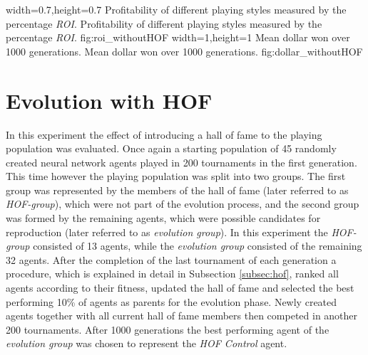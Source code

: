   {width=0.7\textwidth,height=0.7\textheight}%
  {Profitability of different playing styles measured by the percentage \textit{ROI}.}%
  {Profitability of different playing styles measured by the percentage \textit{ROI}.}%
  {fig:roi_withoutHOF}%
  {width=1\textwidth,height=1\textheight}%
  {Mean dollar won over 1000 generations.}%
  {Mean dollar won over 1000 generations.}%
  {fig:dollar_withoutHOF}%
  \pagebreak
\section{Evolution with HOF}
In this experiment the effect of introducing a hall of fame to the playing population was evaluated. Once again a starting population of 45 randomly created neural network agents played in 200 tournaments in the first generation. This time however the playing population was split into two groups. The first group was represented by the members of the hall of fame (later referred to as \textit{HOF-group}), which were not part of the evolution process, and the second group was formed by the remaining agents, which were possible candidates for reproduction (later referred to as \textit{evolution group}). In this experiment the \textit{HOF-group} consisted of 13 agents, while the \textit{evolution group} consisted of the remaining 32 agents. After the completion of the last tournament of each generation a procedure, which is explained in detail in Subsection \ref{subsec:hof}, ranked all agents according to their fitness, updated the hall of fame and selected the best performing 10\% of agents as parents for the evolution phase. Newly created agents together with all current hall of fame members then competed in another 200 tournaments. After 1000 generations the best performing agent of the \textit{evolution group} was chosen to represent the \textit{HOF Control} agent.
